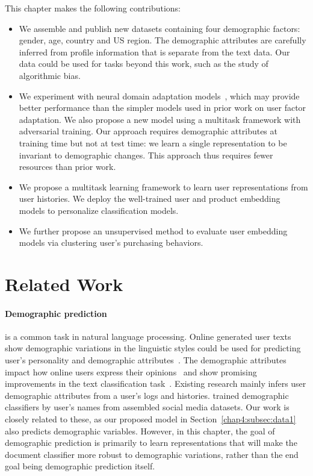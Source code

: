 This chapter makes the following contributions:

\begin{itemize}
    \item We assemble and publish new datasets containing four demographic factors: gender, age, country and US region. The demographic attributes are carefully inferred from profile information that is separate from the text data. Our data could be used for tasks beyond this work, such as the study of algorithmic bias.
    \item We experiment with neural domain adaptation models~\cite{ganin2016domain}, which may provide better performance than the simpler models used in prior work on user factor adaptation. We also propose a new model using a multitask framework with adversarial training. Our approach requires demographic attributes at training time but not at test time: we learn a single representation to be invariant to demographic changes. This approach thus requires fewer resources than prior work.
    \item We propose a multitask learning framework to learn user representations from user histories. We deploy the well-trained user and product embedding models to personalize classification models. 
    \item We further propose an unsupervised method to evaluate user embedding models via clustering user's purchasing behaviors.
\end{itemize}


\section{Related Work}

\paragraph{Demographic prediction}
is a common task in natural language processing.
Online generated user texts show demographic variations in the linguistic styles could be used for predicting user's personality and demographic attributes~\cite{rosenthal2011age, zhang2016predicting, hovy2018improving, wood2020using, gjurkovic2020pandora, lynn2020hierarchical}. 
The demographic attributes impact how online users express their opinions~\cite{volkova2013exploring, hovy2015demographic, wood2017does} and show promising improvements in the text classification task~\cite{lynn2017human, lynn2019tweet}.
Existing research mainly infers user demographic attributes from a user's logs and histories.
\cite{wood2020using} trained demographic classifiers by user's names from assembled social media datasets.
Our work is closely related to these, as our proposed model in Section~\ref{chap4:subsec:data1} also predicts demographic variables.
However, in this chapter, the goal of demographic prediction is primarily to learn representations that will make the document classifier more robust to demographic variations, rather than the end goal being demographic prediction itself.


